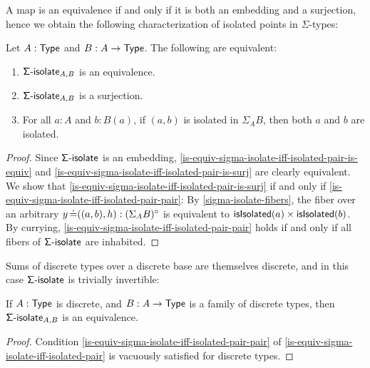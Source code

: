 A map is an equivalence if and only if it is both an embedding and a surjection,
hence we obtain the following characterization of isolated points in \( \Sigma \)-types:
\begin{lemma}\label{is-equiv-sigma-isolate-iff-isolated-pair}
  Let \( A : \operatorname{\mathsf{Type}} \) and \( B : A \to \operatorname{\mathsf{Type}} \).
  The following are equivalent:
  \begin{enumerate}[label=(\arabic*)]
    \item \label{is-equiv-sigma-isolate-iff-isolated-pair-is-equiv}
      \( \operatorname{\mathsf{\Sigma-isolate}}_{A,B} \) is an equivalence.
    \item \label{is-equiv-sigma-isolate-iff-isolated-pair-is-surj}
      \( \operatorname{\mathsf{\Sigma-isolate}}_{A,B} \) is a surjection.
    \item \label{is-equiv-sigma-isolate-iff-isolated-pair-pair}
      For all \( a : A \) and \( b : B(a) \),
      if \( (a , b) \) is isolated in \( \Sigma_{A} B \),
      then both \( a \) and \( b \) are isolated.
  \end{enumerate}
  \begin{proof}
    Since \( \operatorname{\mathsf{\Sigma-isolate}} \) is an embedding, \ref{is-equiv-sigma-isolate-iff-isolated-pair-is-equiv} and \ref{is-equiv-sigma-isolate-iff-isolated-pair-is-surj} are clearly equivalent.
    We show that \ref{is-equiv-sigma-isolate-iff-isolated-pair-is-surj} if and only if \ref{is-equiv-sigma-isolate-iff-isolated-pair-pair}:
    By \autoref{sigma-isolate-fibers}, the fiber over an arbitrary \( y \operatorname{\mathrel{\doteq}} ((a, b), h) : (\Sigma_{A} B)^{\circ} \) is equivalent to
    \( \operatorname{\mathsf{isIsolated}}(a) \times \operatorname{\mathsf{isIsolated}}(b) \).
    By currying, \ref{is-equiv-sigma-isolate-iff-isolated-pair-pair} holds if and only if all fibers of \( \operatorname{\mathsf{\Sigma-isolate}} \) are inhabited.
  \end{proof}
\end{lemma}

Sums of discrete types over a discrete base are themselves discrete,
and in this case \( \operatorname{\mathsf{\Sigma-isolate}} \) is trivially invertible:
\begin{corollary}\label{discrete-is-equiv-sigma-isolated}
  If \( A : \operatorname{\mathsf{Type}} \) is discrete, and \( B : A \to \operatorname{\mathsf{Type}} \) is a family of discrete types,
  then \( \operatorname{\mathsf{\Sigma-isolate}}_{A,B} \) is an equivalence.
  \begin{proof}
    Condition \ref{is-equiv-sigma-isolate-iff-isolated-pair-pair} of \autoref{is-equiv-sigma-isolate-iff-isolated-pair} is vacuously satisfied for discrete types.
  \end{proof}
\end{corollary}

